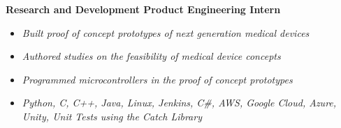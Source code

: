 \documentclass[8pt]{extarticle}
\begin{document}
\textbf{Research and Development Product Engineering Intern} 
\begin{itemize}
\item \textit{Built proof of concept prototypes of next generation medical devices}
\item \textit{Authored studies on the feasibility of medical device concepts}
\item \textit{Programmed microcontrollers in the proof of concept prototypes}

\end{itemize}
\vspace*{-0.4cm}
\makebox[\linewidth]{\rule{17cm}{0.4pt}}
\begin{itemize}
\item \textit{Python, C, C++, Java, Linux, Jenkins, C\#, AWS, Google Cloud, Azure, Unity, Unit Tests using the Catch Library}


\end{itemize}
\end{document}
